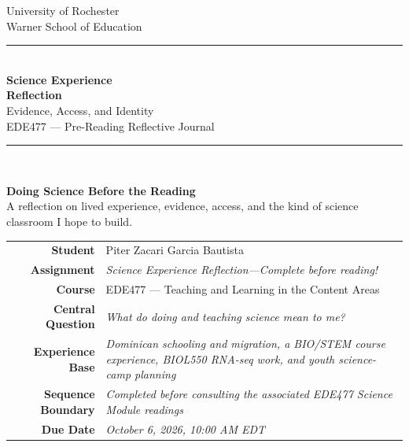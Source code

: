 \documentclass[11pt]{article}
\begin{document}
\hypersetup{pageanchor=false}
\begin{titlepage}
\thispagestyle{empty}

\begin{center}
{\large University of Rochester\\}
{\normalsize Warner School of Education\\[0.15in]}

{\color{PrimaryRed}\rule{\textwidth}{1.4pt}}\\[0.12in]
{\Huge\bfseries Science Experience\\[0.07in]
Reflection}\\[0.15in]
{\huge Evidence, Access, and Identity}\\[0.18in]
{\Large EDE477 --- Pre-Reading Reflective Journal}\\[0.12in]

\vfill

{\color{PrimaryRed}\rule{0.78\textwidth}{0.7pt}}\\[0.20in]
\colorbox{SoftBlue}{%
\parbox{0.88\textwidth}{%
\centering\small\vspace{0.02in}
\textbf{Doing Science Before the Reading}\\[0.05in]
A reflection on lived experience, evidence, access, and the kind of science classroom I hope to build.
}%
}
\end{center}

\vfill

\begin{center}
\renewcommand{\arraystretch}{1.18}
\setlength{\tabcolsep}{4pt}
\begin{tabular}{>{\bfseries}r >{\RaggedRight\arraybackslash}p{5.0in}}
Student & Piter Zacari Garcia Bautista \\
Assignment & \textit{\small Science Experience Reflection---Complete before reading!} \\
Course & EDE477 --- Teaching and Learning in the Content Areas \\
Central Question & \textit{\small What do doing and teaching science mean to me?} \\
Experience Base & \textit{\small Dominican schooling and migration, a BIO/STEM course experience, BIOL550 RNA-seq work, and youth science-camp planning} \\
Sequence Boundary & \textit{\small Completed before consulting the associated EDE477 Science Module readings} \\
Due Date & \textit{\small October 6, 2026, 10:00 AM EDT} \\
\end{tabular}
\end{center}


\end{titlepage}
\end{document}
